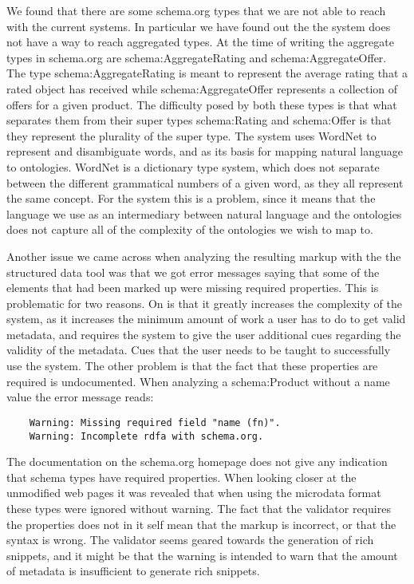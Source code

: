We found that there are some schema.org types that we are not able to reach with the current systems.
In particular we have found out the the system does not have a way to reach aggregated types.
At the time of writing the aggregate types in schema.org are schema:AggregateRating and schema:AggregateOffer.
The type schema:AggregateRating is meant to represent the average rating that a rated object has received
while schema:AggregateOffer represents a collection of offers for a given product.
The difficulty posed by both these types is that what separates them from their super types schema:Rating and schema:Offer
is that they represent the plurality of the super type.
The system uses WordNet to represent and disambiguate words, and as its basis for mapping natural language to ontologies.
WordNet is a dictionary type system, which does not separate between the different grammatical numbers of a given word,
as they all represent the same concept.
For the system this is a problem, since it means that the language we use as an intermediary between natural language
and the ontologies does not capture all of the complexity of the ontologies we wish to map to.


Another issue we came across when analyzing the resulting markup with the the structured data tool was that we got
error messages saying that some of the elements that had been marked up were missing required properties.
This is problematic for two reasons.
On is that it greatly increases the complexity of the system,
as it increases the minimum amount of work a user has to do to get valid metadata,
and requires the system to give the user additional cues regarding the validity of the metadata.
Cues that the user needs to be taught to successfully use the system.
The other problem is that the fact that these properties are required is undocumented.
When analyzing a schema:Product without a name value the error message reads:
\begin{verbatim}
	Warning: Missing required field "name (fn)".
	Warning: Incomplete rdfa with schema.org.
\end{verbatim}
The documentation on the schema.org homepage does not give any indication that schema types have required properties.
When looking closer at the unmodified web pages it was revealed that when using the microdata format these types
were ignored without warning.
The fact that the validator requires the properties does not in it self mean that the markup is incorrect,
or that the syntax is wrong.
The validator seems geared towards the generation of rich snippets,
and it might be that the warning is intended to warn that the amount of metadata is insufficient to generate rich snippets.

